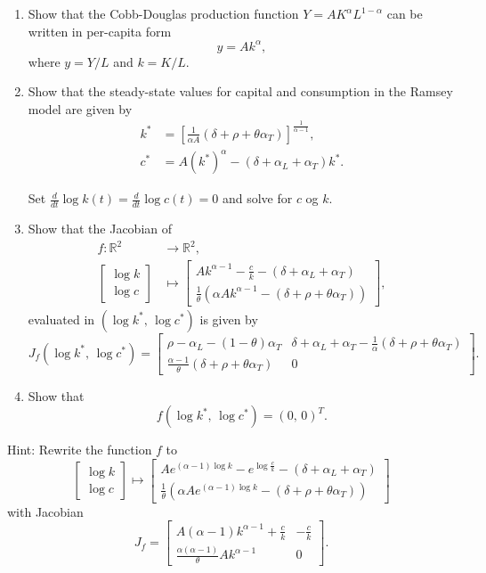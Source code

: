 \documentclass[graybox]{svmult}
\newcommand{\R}{\mathds{R}}
\begin{document}
\begin{enumerate}
	\item Show that the Cobb-Douglas production function $Y=AK^\alpha L^{1-\alpha}$ can be written in per-capita form
	\[
	y = A k^\alpha,
	\]
	where $y=Y/L$ and $k=K/L$.
	\item Show that the steady-state values for capital and consumption in the Ramsey model are given by 
	\begin{align*}
	k^\ast &= \left[ \frac{1}{\alpha A} (\delta + \rho + \theta\alpha_T) \right]^{\frac{1}{\alpha-1}},\\
	c^\ast &= A (k^\ast)^\alpha - (\delta + \alpha_L + \alpha_T) k^\ast.
	\end{align*}
	
	Set $\frac{d}{dt} \log k(t) = \frac{d}{dt}\log c(t) = 0$ and solve for $c$ og $k$.
	
	\item Show that the Jacobian of
	\begin{align*}
	f : \R^2 &\longrightarrow \R^2,\\
	\left[ \begin{array}{c} \log k \\ \log c \end{array} \right] &\longmapsto \left[ \begin{array}{c} Ak^{\alpha-1} - \frac{c}{k} - (\delta + \alpha_L + \alpha_T) \\ \frac{1}{\theta} \left(\alpha A k^{\alpha-1} - (\delta + \rho + \theta\alpha_T)\right) \end{array} \right],
	\end{align*}
	evaluated in $(\log k^\ast,\, \log c^\ast)$ is given by
	\[
	J_f(\log k^*,\,\log c^* ) = \left[ \begin{array}{cc} \rho - \alpha_L - (1-\theta) \alpha_T & \delta + \alpha_L + \alpha_T - \frac{1}{\alpha} (\delta + \rho + \theta\alpha_T) \\ \frac{\alpha-1}{\theta} (\delta + \rho + \theta\alpha_T)  &   0 \end{array} \right].
	\]
	\item Show that
	\[
	f(\log k^*,\, \log c^*) = (0,\, 0)^T.
	\]
\end{enumerate}

Hint: 	Rewrite the function $f$ to
\[
\left[\begin{array}{c}
\log k \\ \log c
\end{array}\right]
\mapsto
\left[\begin{array}{c}
A e^{(\alpha-1)\log k} - e^{\log \frac{c}{k}} - (\delta+\alpha_L+\alpha_T) \\ \frac{1}{\theta}\left(\alpha A e^{(\alpha-1)\log k} - (\delta + \rho + \theta\alpha_T )\right)
\end{array}\right]
\]
with Jacobian
\[
J_f = \left[\begin{array}{cc}
A(\alpha-1)k^{\alpha-1} + \frac{c}{k} & -\frac{c}{k} \\[.4ex]
\frac{\alpha(\alpha-1)}{\theta} A k^{\alpha -1} & 0
\end{array}\right].
\]
\end{document}
